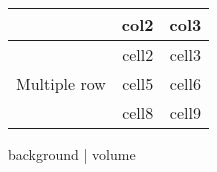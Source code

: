 \documentclass[paper.tex]{subfiles}
\begin{document}
	
\begin{center}
	\begin{tabular}{ |c|c|c| } 
		\hline
		 & col2 & col3 \\
		\hline
		\multirow{3}{4em}{Multiple row} 
		& cell2 & cell3 \\ 
		& cell5 & cell6 \\ 
		& cell8 & cell9 \\ 
		\hline
	\end{tabular}
\end{center}

background | volume 
\end{document}
